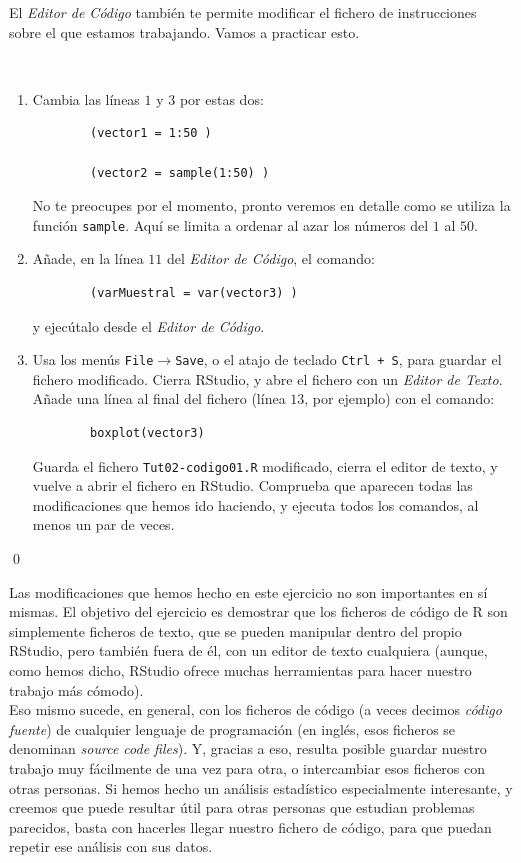 \documentclass[10pt,a4paper]{article}\usepackage[]{graphicx}\usepackage[]{color}
\begin{document}
El {\em Editor de Código} también te permite modificar el fichero de instrucciones sobre el que estamos trabajando. Vamos a  practicar esto.

\begin{ejercicio}
\label{tut02:ejercicio21}
\quad\\
\begin{enumerate}
  \item Cambia las líneas $1$ y $3$ por estas dos:
        \begin{verbatim}
        (vector1 = 1:50 )

        (vector2 = sample(1:50) )
        \end{verbatim}
        No te preocupes por el momento, pronto veremos en detalle como se utiliza la función {\tt sample}. Aquí se limita a ordenar al azar los números del $1$ al $50$.

  \item Añade, en la línea $11$ del {\em Editor de Código}, el comando:
        \begin{verbatim}
        (varMuestral = var(vector3) )
        \end{verbatim}
        y ejecútalo desde el {\em Editor de Código}.

  \item Usa los menús {\tt File}$\to${\tt Save}, o el atajo de teclado {\tt Ctrl + S}, para guardar el fichero modificado. Cierra RStudio, y abre el fichero con un {\em Editor de Texto}. Añade una línea al final del fichero (línea $13$, por ejemplo) con el comando:
        \begin{verbatim}
        boxplot(vector3)
        \end{verbatim}
        Guarda el fichero {\tt Tut02-codigo01.R} modificado, cierra el editor de texto, y vuelve a abrir el fichero en RStudio. Comprueba que aparecen todas las modificaciones que hemos ido haciendo, y ejecuta todos los comandos, al menos un par de veces.
\end{enumerate}
\qed
\end{ejercicio}
Las modificaciones que hemos hecho en este ejercicio no son importantes en sí mismas. El objetivo del ejercicio es demostrar que los ficheros de código de R son simplemente ficheros de texto, que se pueden manipular dentro del propio RStudio, pero también fuera de él, con un editor de texto cualquiera (aunque, como hemos dicho, RStudio ofrece muchas herramientas para hacer nuestro trabajo más cómodo).\\

Eso mismo sucede, en general, con los ficheros de código (a veces decimos {\em código fuente}) de cualquier lenguaje de programación (en inglés, esos ficheros se denominan {\em source code files}). Y, gracias a eso, resulta posible guardar nuestro trabajo muy fácilmente de una vez para otra, o intercambiar esos ficheros con otras personas. Si hemos hecho un análisis estadístico especialmente interesante, y creemos que puede resultar útil para otras personas que estudian problemas parecidos, basta con hacerles llegar nuestro fichero de código, para que puedan repetir ese análisis con sus datos.
\end{document}
